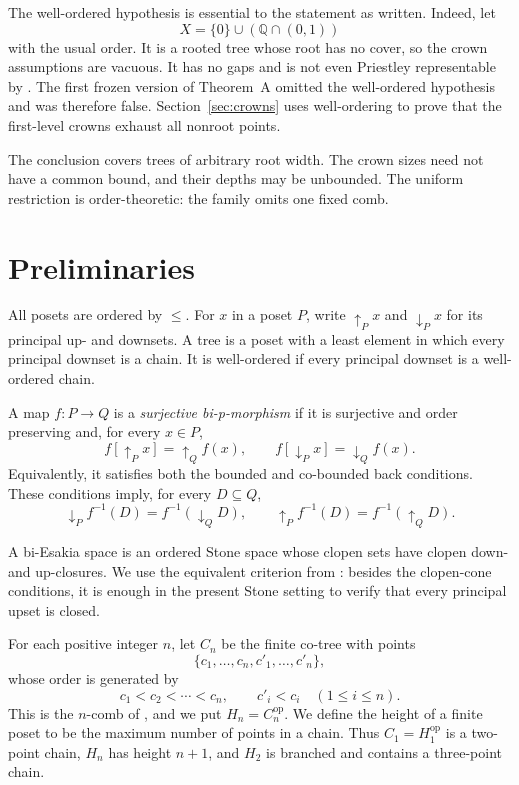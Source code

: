 \documentclass[11pt]{article}
\theoremstyle{remark}
\numberwithin{equation}{section}
\begin{document}
The well-ordered hypothesis is essential to the statement as written. Indeed,
let
\[
X=\{0\}\cup(\mathbb Q\cap(0,1))
\]
with the usual order. It is a rooted tree whose root has no cover, so the crown
assumptions are vacuous. It has no gaps and is not even Priestley representable
by \cite[Proposition 2.5]{ref4}. The first frozen version of Theorem~A omitted
the well-ordered hypothesis and was therefore false. Section~\ref{sec:crowns}
uses well-ordering to prove that the first-level crowns exhaust all nonroot
points.

The conclusion covers trees of arbitrary root width. The crown sizes need not
have a common bound, and their depths may be unbounded. The uniform restriction
is order-theoretic: the family omits one fixed comb.

\section{Preliminaries}

All posets are ordered by $\leq$. For $x$ in a poset $P$, write
$\uparrow_Px$ and $\downarrow_Px$ for its principal up- and downsets. A tree is
a poset with a least element in which every principal downset is a chain. It is
well-ordered if every principal downset is a well-ordered chain.

A map $f:P\to Q$ is a \emph{surjective bi-p-morphism} if it is surjective and
order preserving and, for every $x\in P$,
\begin{equation}
f[\uparrow_Px]=\uparrow_Qf(x),
\qquad
f[\downarrow_Px]=\downarrow_Qf(x).
\label{eq:bip}
\end{equation}
Equivalently, it satisfies both the bounded and co-bounded back conditions.
These conditions imply, for every $D\subseteq Q$,
\begin{equation}
\downarrow_P f^{-1}(D)=f^{-1}(\downarrow_QD),
\qquad
\uparrow_P f^{-1}(D)=f^{-1}(\uparrow_QD).
\label{eq:inverse-cones}
\end{equation}

A bi-Esakia space is an ordered Stone space whose clopen sets have clopen down-
and up-closures. We use the equivalent criterion from
\cite[Theorem 2.12]{ref3}: besides the clopen-cone conditions, it is enough in
the present Stone setting to verify that every principal upset is closed.

For each positive integer $n$, let $C_n$ be the finite co-tree with points
\[
\{c_1,\ldots,c_n,c'_1,\ldots,c'_n\},
\]
whose order is generated by
\begin{equation}
c_1<c_2<\cdots<c_n,
\qquad
c'_i<c_i\quad(1\leq i\leq n).
\label{eq:comb}
\end{equation}
This is the $n$-comb of \cite[Figure 6]{ref5}, and we put
$H_n=C_n^{\mathrm{op}}$. We define the height of a finite poset to be the
maximum number of points in a chain. Thus $C_1=H_1^{\mathrm{op}}$ is a
two-point chain, $H_n$ has height $n+1$, and $H_2$ is branched and contains a
three-point chain.
\end{document}

